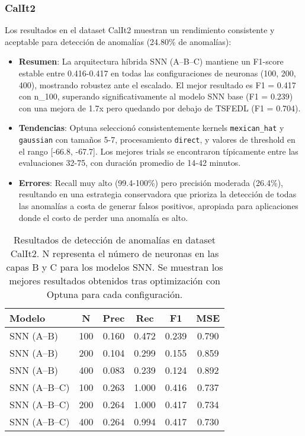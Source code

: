 \subsubsection{CalIt2}
Los resultados en el dataset CalIt2 muestran un rendimiento consistente y aceptable para detección de anomalías (24.80\% de anomalías):
\begin{itemize}
    \item \textbf{Resumen}: La arquitectura híbrida SNN (A--B--C) mantiene un F1-score estable entre 0.416-0.417 en todas las configuraciones de neuronas (100, 200, 400), mostrando robustez ante el escalado. El mejor resultado es F1 = 0.417 con n\_100, superando significativamente al modelo SNN base (F1 = 0.239) con una mejora de 1.7x pero quedando por debajo de TSFEDL (F1 = 0.704).
    \item \textbf{Tendencias}: Optuna seleccionó consistentemente kernels \texttt{mexican\_hat} y \texttt{gaussian} con tamaños 5-7, procesamiento \texttt{direct}, y valores de threshold en el rango [-66.8, -67.7]. Los mejores trials se encontraron típicamente entre las evaluaciones 32-75, con duración promedio de 14-42 minutos.
    \item \textbf{Errores}: Recall muy alto (99.4-100\%) pero precisión moderada (26.4\%), resultando en una estrategia conservadora que prioriza la detección de todas las anomalías a costa de generar falsos positivos, apropiada para aplicaciones donde el costo de perder una anomalía es alto.
\end{itemize}

\begin{table}[htbp]
\centering
\small
\begin{tabular}{lccccc}
\hline\hline
\textbf{Modelo} & \textbf{N} & \textbf{Prec} & \textbf{Rec} & \textbf{F1} & \textbf{MSE} \\
\hline
SNN (A--B) & 100 & 0.160 & 0.472 & 0.239 & 0.790 \\
SNN (A--B) & 200 & 0.104 & 0.299 & 0.155 & 0.859 \\
SNN (A--B) & 400 & 0.083 & 0.239 & 0.124 & 0.892 \\
\hline
SNN (A--B--C) & 100 & 0.263 & 1.000 & 0.416 & 0.737 \\
SNN (A--B--C) & 200 & 0.264 & 1.000 & 0.417 & 0.734 \\
SNN (A--B--C) & 400 & 0.264 & 0.994 & 0.417 & 0.730 \\
\hline\hline
\end{tabular}
\caption{Resultados de detección de anomalías en dataset CalIt2. N representa el número de neuronas en las capas B y C para los modelos SNN. Se muestran los mejores resultados obtenidos tras optimización con Optuna para cada configuración.}
\label{tab:resultados-iops-escalabilidad}
\end{table}


